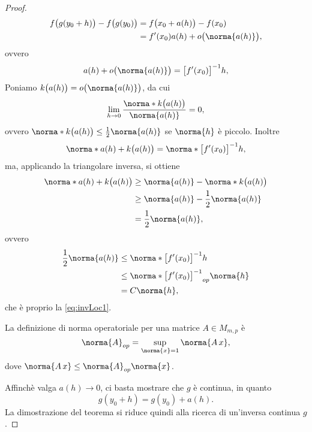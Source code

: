 \begin{proof}
\[\begin{split}
			f\big(g(y_0+h)\big)-f\big(g(y_0)\big) & =f\big(x_0+a(h)\big)-f(x_0)\\
			& =f'(x_0)a(h)+o\big(\norma{a(h)}\big),
		\end{split}
	\]
	ovvero
	\[
		a(h)+o\big(\norma{a(h)}\big)=\big[f'(x_0)\big]^{-1}h,
	\]
	Poniamo \(k\big(a(h)\big)=o\big(\norma{a(h)}\big)\), da cui
	\[
		\lim_{h\to 0}\frac{\norma*{k\big(a(h)\big)}}{\norma{a(h)}}=0,
	\]
	ovvero \(\norma*{k\big(a(h)\big)}\le\frac{1}{2}\norma{a(h)}\) se \(\norma{h}\) è piccolo.
	Inoltre
	\[
		\norma*{a(h)+k\big(a(h)\big)}=\norma*{\big[f'(x_0)\big]^{-1}h},
	\]
	ma, applicando la triangolare inversa, si ottiene
	\[
		\begin{split}
			\norma*{a(h)+k\big(a(h)\big)} & \ge\norma{a(h)}-\norma*{k\big(a(h)\big)}\\
			& \ge\norma{a(h)}-\frac{1}{2}\norma{a(h)}\\
			& =\frac{1}{2}\norma{a(h)},
		\end{split}
	\]
	ovvero
	\[
		\begin{split}
			\frac{1}{2}\norma{a(h)} & \le\norma*{\big[f'(x_0)\big]^{-1}h}\\
			& \le\norma*{\big[f'(x_0)\big]^{-1}}_{op}\norma{h}\\
			& =C\norma{h},
		\end{split}
	\]
	che è proprio la \eqref{eq:invLoc1}.
	\begin{oss}
		La definizione di norma operatoriale per una matrice \(A\in M_{m,p}\) è
		\[
			\norma{A}_{op}=\sup_{\norma{x}=1}\norma{A\,x},
		\]
		dove \(\norma{A\,x}\le\norma{A}_{op}\norma{x}\).
	\end{oss}
	Affinchè valga \(a(h)\to 0\), ci basta mostrare che \(g\) è continua, in quanto
	\[
		g(y_0+h)=g(y_0)+a(h).
	\]
	La dimostrazione del teorema si riduce quindi alla ricerca di un'inversa continua \(g\).


\end{proof}
